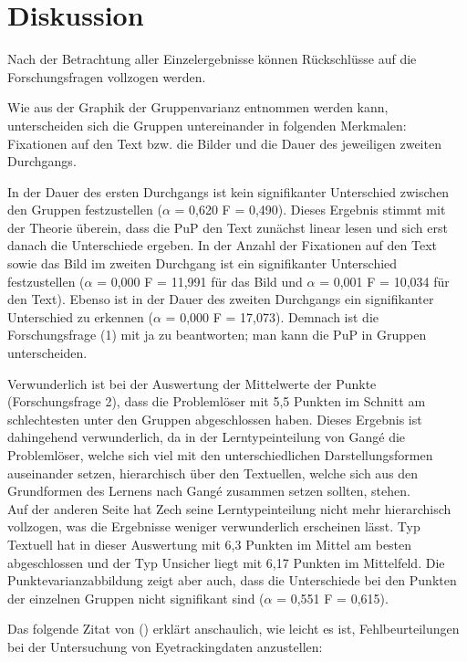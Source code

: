 \chapter{Diskussion}

Nach der Betrachtung aller Einzelergebnisse können Rückschlüsse auf die Forschungsfragen vollzogen werden.  

Wie aus der Graphik der Gruppenvarianz entnommen werden kann, unterscheiden sich die Gruppen untereinander in folgenden Merkmalen: Fixationen auf den Text bzw. die Bilder und die Dauer des jeweiligen zweiten Durchgangs.

In der Dauer des ersten Durchgangs ist kein signifikanter Unterschied zwischen den Gruppen festzustellen ($\alpha$ = 0,620 F = 0,490). Dieses Ergebnis stimmt mit der Theorie überein, dass die \gls{PuP} den Text zunächst linear lesen und sich erst danach die Unterschiede ergeben. In der Anzahl der Fixationen auf den Text sowie das Bild im zweiten Durchgang ist ein signifikanter Unterschied festzustellen ($\alpha$ = 0,000 F = 11,991 für das Bild und $\alpha$ = 0,001 F = 10,034 für den Text). Ebenso ist in der Dauer des zweiten Durchgangs ein signifikanter Unterschied zu erkennen ($\alpha$ = 0,000 F = 17,073). Demnach ist die Forschungsfrage (1) mit ja zu beantworten; man kann die \gls{PuP} in Gruppen unterscheiden.

Verwunderlich ist bei der Auswertung der Mittelwerte der Punkte (Forschungsfrage 2), dass die Problemlöser mit 5,5 Punkten im Schnitt am schlechtesten unter den Gruppen abgeschlossen haben. Dieses Ergebnis ist dahingehend verwunderlich, da in der Lerntypeinteilung von Gangé die Problemlöser, welche sich viel mit den unterschiedlichen Darstellungsformen auseinander setzen, hierarchisch über den Textuellen, welche sich aus den Grundformen des Lernens nach Gangé zusammen setzen sollten, stehen. \\
Auf der anderen Seite hat Zech seine Lerntypeinteilung nicht mehr hierarchisch vollzogen, was die Ergebnisse weniger verwunderlich erscheinen lässt. Typ Textuell hat in dieser Auswertung mit 6,3 Punkten im Mittel am besten abgeschlossen und der Typ Unsicher liegt mit 6,17 Punkten im Mittelfeld. Die Punktevarianzabbildung zeigt aber auch, dass die Unterschiede bei den Punkten der einzelnen Gruppen nicht signifikant sind ($\alpha$ = 0,551 F = 0,615). 

Das folgende Zitat von \citeauthor{hyrskykari2008gaze} () erklärt anschaulich, wie leicht es ist, Fehlbeurteilungen bei der Untersuchung von Eyetrackingdaten anzustellen:

